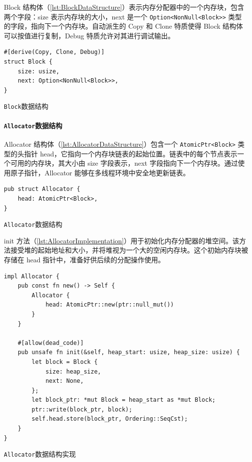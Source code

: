 Block 结构体（\cref{lst:BlockDataStructure}）表示内存分配器中的一个内存块，包含两个字段：size 表示内存块的大小，next 是一个 \texttt{Option<NonNull<Block>>} 类型的字段，指向下一个内存块。自动派生的 Copy 和 Clone 特质使得 Block 结构体可以按值进行复制，Debug 特质允许对其进行调试输出。

\begin{listing}[htbp]
    \begin{verbatim}
#[derive(Copy, Clone, Debug)]
struct Block {
    size: usize,
    next: Option<NonNull<Block>>,
}
    \end{verbatim}
    \caption{\texttt{Block}数据结构}\label{lst:BlockDataStructure}
\end{listing}

\paragraph{\texttt{Allocator}数据结构}

Allocator 结构体（\cref{lst:AllocatorDataStructure}）包含一个 \texttt{AtomicPtr<Block>} 类型的头指针 head，它指向一个内存块链表的起始位置。链表中的每个节点表示一个可用的内存块，其大小由 size 字段表示，next 字段指向下一个内存块。通过使用原子指针，Allocator 能够在多线程环境中安全地更新链表。

\begin{listing}[htbp]
    \begin{verbatim}
pub struct Allocator {
    head: AtomicPtr<Block>,
}
    \end{verbatim}
    \caption{\texttt{Allocator}数据结构}\label{lst:AllocatorDataStructure}
\end{listing}

init 方法（\cref{lst:AllocatorImplementation}）用于初始化内存分配器的堆空间。该方法接受堆的起始地址和大小，并将堆视为一个大的空闲内存块。这个初始内存块被存储在 head 指针中，准备好供后续的分配操作使用。

\begin{listing}[htbp]
    \begin{verbatim}
impl Allocator {
    pub const fn new() -> Self {
        Allocator {
            head: AtomicPtr::new(ptr::null_mut())
        }
    }

    #[allow(dead_code)]
    pub unsafe fn init(&self, heap_start: usize, heap_size: usize) {
        let block = Block {
            size: heap_size,
            next: None,
        };
        let block_ptr: *mut Block = heap_start as *mut Block;
        ptr::write(block_ptr, block);
        self.head.store(block_ptr, Ordering::SeqCst);
    }
}
    \end{verbatim}
    \caption{\texttt{Allocator}数据结构实现}\label{lst:AllocatorImplementation}
\end{listing}

